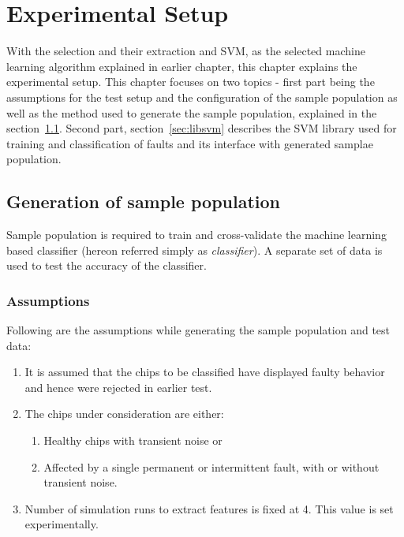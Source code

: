 \chapter{Experimental Setup}
\label{chap:chapter5}
With the selection and their extraction and SVM, as the selected machine learning algorithm explained in earlier chapter, this chapter explains the experimental setup. This chapter focuses on two topics - first part being the assumptions for the test setup and the configuration of the sample population as well as the method used to generate the sample population, explained in the section~\ref{sec:gsp}. Second part, section~\ref{sec:libsvm} describes the SVM library used for training and classification of faults and its interface with generated samplae population.
\section{Generation of sample population}
\label{sec:gsp}
Sample population is required to train and cross-validate the machine learning based classifier (hereon referred simply as \emph{classifier}). A separate set of data is used to test the accuracy of the classifier.
\subsection{Assumptions}
\label{sec:gsp:assumptions}
Following are the assumptions while generating the sample population and test data:
\begin{enumerate}
  \item It is assumed that the chips to be classified have displayed faulty behavior and hence were rejected in earlier test.
  \item The chips under consideration are either:
		  \begin{enumerate}
    		\item Healthy chips with transient noise or
    		\item Affected by a single permanent or intermittent fault, with or without transient noise.
 		 \end{enumerate}
	\item Number of simulation runs to extract features is fixed at 4. This value is set experimentally. 
\end{enumerate}

